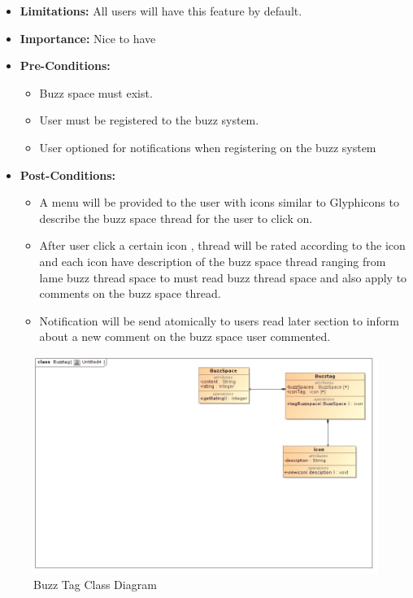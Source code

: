 \documentclass[11pt]{article}
\begin{document}
\begin{enumerate}
\begin{itemize}
\item\textbf{Limitations:} 
All users will have this feature by default.

\item \textbf{Importance:} Nice to have
\item\textbf{Pre-Conditions: }
	\begin{itemize}
	\item Buzz space must exist.
	\item User must be registered to the buzz system.
	\item User optioned for notifications when registering on the buzz system

	\end{itemize}

\item\textbf{Post-Conditions: }
	\begin{itemize}
	\item A menu will be provided to the user with icons similar to Glyphicons
to describe the buzz space thread for the user to click on.
	\item After user click a certain icon , thread will be rated according to
the icon and each icon have description of the buzz space thread
ranging from lame buzz thread space to must read buzz thread
space and also apply to comments on the buzz space thread.
\item Notification will be send atomically to users read later section to
inform about a new comment on the buzz space user commented.
	
	\end{itemize}
\end{itemize}

\begin{figure}[H]	
\graphicspath{ {../Diagrams/sfiso/} }
    	\includegraphics[scale=0.5]{buzzC.jpg}
    	\caption{Buzz Tag Class Diagram}
	\end{figure}
	

\end{enumerate}
\end{document}
